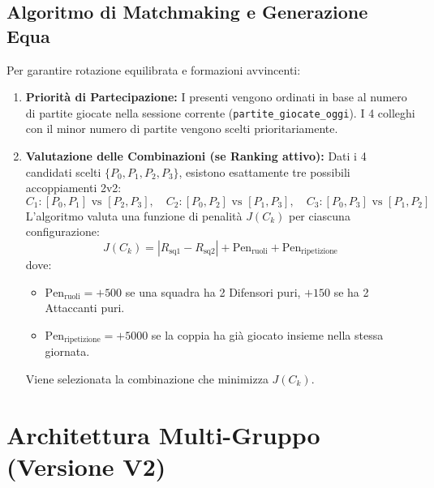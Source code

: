 \documentclass[11pt,a4paper]{article}
\begin{document}
\subsection{Algoritmo di Matchmaking e Generazione Equa}
Per garantire rotazione equilibrata e formazioni avvincenti:
\begin{enumerate}
    \item \textbf{Priorit\`a di Partecipazione:} I presenti vengono ordinati in base al numero di partite giocate nella sessione corrente (\texttt{partite\_giocate\_oggi}). I 4 colleghi con il minor numero di partite vengono scelti prioritariamente.
    \item \textbf{Valutazione delle Combinazioni (se Ranking attivo):}
    Dati i 4 candidati scelti $\{P_0, P_1, P_2, P_3\}$, esistono esattamente tre possibili accoppiamenti 2v2:
    \[ C_1: [P_0, P_1] \text{ vs } [P_2, P_3], \quad C_2: [P_0, P_2] \text{ vs } [P_1, P_3], \quad C_3: [P_0, P_3] \text{ vs } [P_1, P_2] \]
    L'algoritmo valuta una funzione di penalit\`a $J(C_k)$ per ciascuna configurazione:
    \begin{equation}
    J(C_k) = |R_{\text{sq1}} - R_{\text{sq2}}| + \text{Pen}_{\text{ruoli}} + \text{Pen}_{\text{ripetizione}}
    \end{equation}
    dove:
    \begin{itemize}
        \item $\text{Pen}_{\text{ruoli}} = +500$ se una squadra ha 2 Difensori puri, $+150$ se ha 2 Attaccanti puri.
        \item $\text{Pen}_{\text{ripetizione}} = +5000$ se la coppia ha gi\`a giocato insieme nella stessa giornata.
    \end{itemize}
    Viene selezionata la combinazione che minimizza $J(C_k)$.
\end{enumerate}

\section{Architettura Multi-Gruppo (Versione V2)}
\end{document}
